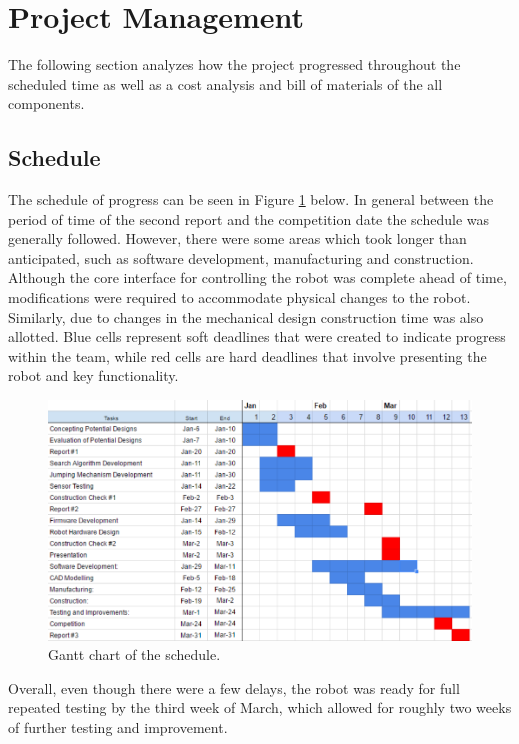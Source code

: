 \documentclass[ece]{uw-wkrpt}
\let\oldsection\section
\renewcommand\section{\clearpage\oldsection}
\begin{document}
\section{Project Management}
The following section analyzes how the project progressed throughout the scheduled time as well as a cost analysis and bill of materials of the all components.

\subsection{Schedule}

The schedule of progress can be seen in Figure \ref{fig:gantt} below. In general between the period of time of the second report and the competition date the schedule was generally followed. However, there were some areas which took longer than anticipated, such as software development, manufacturing and construction. Although the core interface for controlling the robot was complete ahead of time, modifications were required to accommodate physical changes to the robot. Similarly, due to changes in the mechanical design construction time was also allotted. Blue cells represent soft deadlines that were created to indicate progress within the team, while red cells are hard deadlines that involve presenting the robot and key functionality.

\begin{figure}
    \centering
    \includegraphics[width=5.5in]{res/gantChart}
    \caption[Gantt chart of the schedule]
          {Gantt chart of the schedule.}
    \label{fig:gantt}
\end{figure}

Overall, even though there were a few delays, the robot was ready for full repeated testing by the third week of March, which allowed for roughly two weeks of further testing and improvement.
\end{document}
